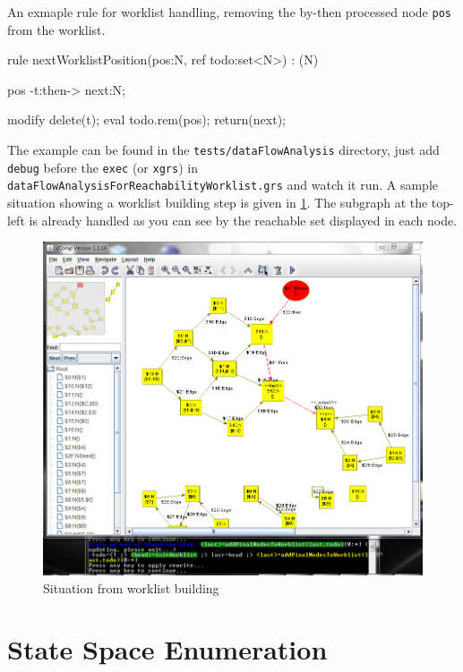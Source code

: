   \begin{example}
An exmaple rule for worklist handling, removing the by-then processed node \texttt{pos} from the worklist.
    \begin{grgen}
rule nextWorklistPosition(pos:N, ref todo:set<N>) : (N)
{
  pos -t:then-> next:N;

  modify {
    delete(t);
    eval { todo.rem(pos); }
    return(next);
  }
}
    \end{grgen}
  \end{example}

The example can be found in the \texttt{tests/dataFlowAnalysis} directory, just add \texttt{debug} before the \texttt{exec} (or \texttt{xgrs}) in \texttt{dataFlowAnalysisForReachabilityWorklist.grs} and watch it run.
A sample situation showing a worklist building step is given in \ref{figworklist}.
The subgraph at the top-left is already handled as you can see by the reachable set displayed in each node.

\begin{figure}[htbp]
  \centering
  \includegraphics[width=\textwidth]{fig/Worklist}
  \caption{Situation from worklist building}
  \label{figworklist}
\end{figure}


\section{State Space Enumeration}\label{sec:statespaceenum}


